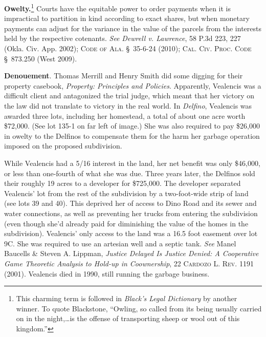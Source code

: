 
\item \textbf{Owelty.}\footnote{This charming term is followed in
\textit{Black's Legal Dictionary} by another winner. To quote Blackstone,
``Owling, so called from its being usually carried on in the night,\dots is
the offense of transporting sheep or wool out of this kingdom.''} Courts have
the equitable power to order  payments when it is impractical to
partition in kind according to exact shares, but when monetary payments can
adjust for the variance in the value of the parcels from the interests held by
the respective cotenants. \textit{See} \emph{Dewrell v. Lawrence}, 58 P.3d 223,
227
(Okla. Civ. App. 2002); \textsc{Code of Ala.} \S~35-6-24 (2010); \textsc{Cal.
Civ. Proc. Code} \S~873.250 (West 2009).


\item \textbf{Denouement}. Thomas Merrill and Henry Smith did some digging for
their property casebook, \textit{Property: Principles and Policies}.
Apparently, Vealencis was a difficult client and antagonized the trial judge,
which meant that her victory on the law did not translate to victory in the
real world. In \textit{Delfino}, Vealencis was awarded three lots, including
her homestead, a total of about one acre worth \$72,000. (See lot 135-1 on far
left of image.) She was also required to pay \$26,000 in owelty to the
Delfinos to compensate them for the harm her garbage operation imposed on the
proposed subdivision.


While Vealencis had a 5/16 interest in the land, her net benefit was only
\$46,000, or less than one-fourth of what she was due. Three years later, the
Delfinos sold their roughly 19 acres to a developer for \$725,000. The
developer separated Vealencis' lot from the rest of the subdivision by a
two-foot-wide strip of land (see lots 39 and 40). This deprived her of access
to Dino Road and its sewer and water connections, as well as preventing her
trucks from entering the subdivision (even though she'd already paid for
diminishing the value of the homes in the subdivision). Vealencis' only access
to the land was a 16.5 foot easement over lot 9C. She was required to use an
artesian well and a septic tank. \textit{See} Manel Baucells \& Steven A.
Lippman, \textit{Justice Delayed Is Justice Denied: A Cooperative Game
Theoretic Analysis to Hold-up in Coownership}, 22 \textsc{Cardozo L. Rev.} 1191
(2001). Vealencis died in 1990, still running the garbage business.



